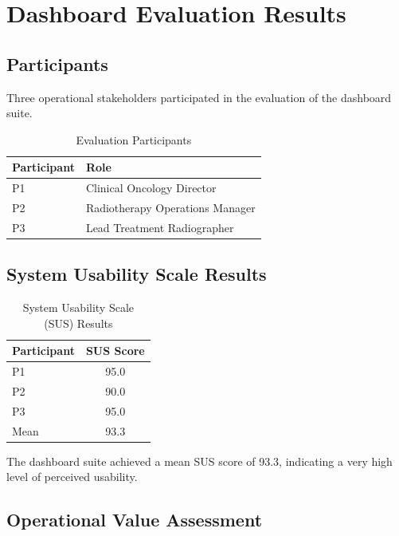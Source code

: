 \chapter{Dashboard Evaluation Results} \label{appendix:evaluation} 

\section{Participants} 
Three operational stakeholders participated in the evaluation of the dashboard suite. 

\begin{table}[h] 
    \centering 
    \begin{tabular}{|p{3cm}|p{8cm}|} 
        \hline 
        \textbf{Participant} & \textbf{Role} \\ 
        \hline\hline
        P1 & Clinical Oncology Director \\ 
        P2 & Radiotherapy Operations Manager \\ 
        P3 & Lead Treatment Radiographer \\ 
        \hline 
    \end{tabular} 
    \caption{Evaluation Participants} 
\end{table}

\section{System Usability Scale Results} 
\begin{table}[h] 
    \centering 
    \begin{tabular}{|l|c|} 
        \hline 
        \textbf{Participant} & \textbf{SUS Score} \\ 
        \hline\hline 
        P1 & 95.0 \\ 
        P2 & 90.0 \\ 
        P3 & 95.0 \\ 
        \hline 
        Mean & 93.3 \\ 
        \hline 
    \end{tabular} 
    \caption{System Usability Scale (SUS) Results} 
\end{table} 

The dashboard suite achieved a mean SUS score of 93.3, indicating a very high level of perceived usability.

\section{Operational Value Assessment} 

